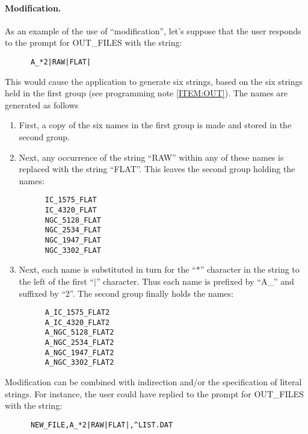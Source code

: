 \paragraph {Modification.}
As an example of the use of ``modification'', let's suppose that the user
responds to the prompt for OUT\_FILES with the string:

\small
\begin{verbatim}
      A_*2|RAW|FLAT|
\end{verbatim}
\normalsize

This would cause the application to generate six strings, based on the
six strings held in the first group (see programming note \ref{ITEM:OUT}).
The names are generated as follows
\begin{enumerate}
\item First, a copy of the six names in the first group is made and stored in
the second group.
\item Next, any occurrence of the string ``RAW'' within any of these
names is replaced with the string ``FLAT''. This
leaves the second group holding the names:

\small
\begin{verbatim}
      IC_1575_FLAT
      IC_4320_FLAT
      NGC_5128_FLAT
      NGC_2534_FLAT
      NGC_1947_FLAT
      NGC_3302_FLAT
\end{verbatim}
\normalsize

\item Next, each name is substituted in turn for the ``$*$'' character in the
string to the left of the first ``$\mid$'' character. Thus each name is prefixed by
``A\_'' and suffixed by ``2''. The second group finally holds the names:

\small
\begin{verbatim}
      A_IC_1575_FLAT2
      A_IC_4320_FLAT2
      A_NGC_5128_FLAT2
      A_NGC_2534_FLAT2
      A_NGC_1947_FLAT2
      A_NGC_3302_FLAT2
\end{verbatim}
\normalsize

\end{enumerate}

Modification can be combined with indirection and/or the specification of
literal strings. For instance, the user could have replied to the prompt for
OUT\_FILES with the string:

\small
\begin{verbatim}
      NEW_FILE,A_*2|RAW|FLAT|,^LIST.DAT
\end{verbatim}
\normalsize

